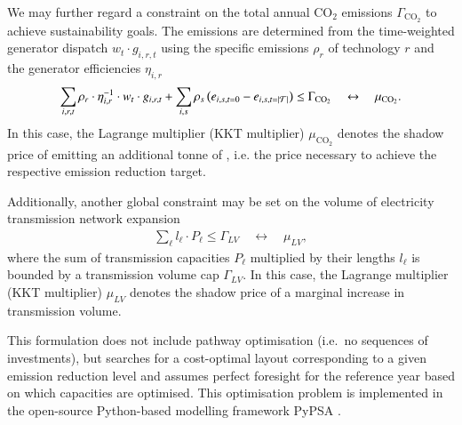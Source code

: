 We may further regard a constraint on the total annual CO$_2$ emissions $\Gamma_{\text{CO}_2}$
to achieve sustainability goals.
The emissions are determined from the time-weighted generator dispatch $ w_t \cdot g_{i,r,t}$ using the specific emissions $\rho_r$ of technology $r$
and the generator efficiencies $\eta_{i,r}$
\begin{align}
	\sum_{i,r,t}  \rho_r \cdot \eta_{i,r}^{-1} \cdot w_t \cdot g_{i,r,t} + \sum_{i,s} \rho_s \left(e_{i,s,t=0} - e_{i,s,t=\left|\mathcal{T}\right|}\right) \leq \Gamma_{\text{CO}_2}  \quad \leftrightarrow \quad \mu_{\text{CO}_2}.
\end{align}
In this case, the Lagrange multiplier (KKT multiplier) $\mu_{\text{CO}_2}$ denotes the shadow price of emitting an additional tonne of \co, i.e. the \co price necessary to achieve the respective \co emission reduction target.

Additionally, another global constraint may be set on the volume of electricity transmission network expansion
\begin{align}
    \sum_\ell l_\ell \cdot P_\ell \leq \Gamma_{LV} \quad \leftrightarrow \quad \mu_{LV},
\end{align}
where the sum of transmission capacities $P_\ell$ multiplied by their lengths $l_\ell$ is bounded by a transmission volume cap
$\Gamma_{LV}$. In this case, the Lagrange multiplier (KKT multiplier) $\mu_{LV}$ denotes the shadow price of a marginal increase in transmission volume.

This formulation does not include pathway optimisation (i.e.~no
sequences of investments), but searches for a cost-optimal layout corresponding
to a given \co emission reduction level and assumes perfect foresight for
the reference year based on which capacities are optimised. This optimisation
problem is implemented in the open-source Python-based modelling framework
PyPSA \cite{brownPyPSAPython2018}.
